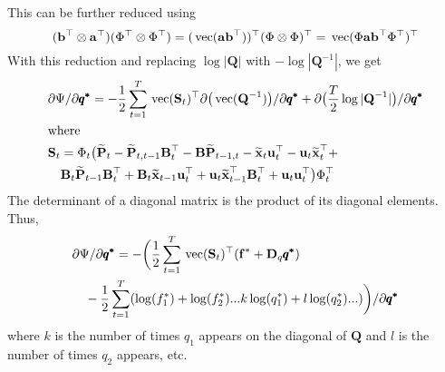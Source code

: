 \documentclass[]{article}
\def\UPS{\mbox{\boldmath $\Upsilon$}}
\def\BB{\mbox{$\mathbf B$}}	\def\bb{\mbox{$\mathbf b$}} \def\Bb{\mbox{$\mathbf J$}} \def\Ba{\mbox{$\mathbf L$}} \def\Bm{\UPS}
\def\DD{\mbox{$\mathbf D$}}	\def\dd{\mbox{$\mathbf d$}}
\def\PP{\mbox{$\mathbf P$}}  \def\pp{\mbox{$\mathbf p$}}
\def\QQ{\mbox{$\mathbf Q$}}	 \def\qq{\mbox{$\mathbf q$}} \def\Qb{\mbox{$\mathbf G$}}  \def\Qm{\mathbb{Q}}
\def\SS{\mbox{$\mathbf S$}}
\def\vec{\,\textup{\textrm{vec}}}
\def\hatxt{\widetilde{\mbox{$\mathbf x$}}_t}
\def\hatxtm{\widetilde{\mbox{$\mathbf x$}}_{t-1}}
\def\hatPt{\widetilde{\PP}_t}
\def\hatPtm{\widetilde{\PP}_{t-1}}
\def\hatPttm{\widetilde{\PP}_{t,t-1}}
\def\hatPtmt{\widetilde{\PP}_{t-1,t}}
\begin{document}
This can be further reduced using
$$(\bb^\top \otimes \aa^\top)(\Phi^\top \otimes \Phi^\top)=(\vec(\aa\bb^\top))^\top (\Phi \otimes \Phi)^\top = \vec(\Phi \aa\bb^\top \Phi^\top)^\top$$
With this reduction and replacing $\log|\QQ|$ with $-\log|\QQ^{-1}|$, we get
\begin{equation}
\begin{split}
&\partial\Psi/\partial\pmb{q^{*}} = -\frac{1}{2} \sum_{t=1}^T\vec(\SS_t)^\top\partial\big(\vec(\QQ^{-1})\big)/\partial\pmb{q^{*}}
+ \partial\big(\frac{T}{2}\log|\QQ^{-1}| \big)/\partial\pmb{q^{*}} \\
&\text{where }\\
&\SS_t=\Phi_t\big(\hatPt - \hatPttm \BB_t^\top - \BB\hatPtmt 
- \hatxt\uu_t^\top - \uu_t \hatxt^\top + \\
&\quad \BB_t\hatPtm\BB_t^\top + \BB_t\hatxtm\uu_t^\top + \uu_t\hatxtm^\top\BB_t^\top + \uu_t\uu_t^\top \big)\Phi_t^\top
\end{split}
\end{equation}
The determinant of a diagonal matrix is the product of its diagonal elements. Thus,
\begin{equation}\label{eq:Q.gendiag3}
\begin{split}
&\partial\Psi/\partial\pmb{q^{*}}= 
 -\bigg(\frac{1}{2} \sum_{t=1}^T \vec(\SS_t)^\top (\ff^{*} + \DD_q\pmb{q^{*}})  \\
&\quad - \frac{1}{2}\sum_{t=1}^T(\log(f^{*}_1) + \log(f^{*}_2) ... k\log(q^{*}_1) + l\log(q^{*}_2)...)\bigg)/\partial\pmb{q^{*}}\\
\end{split}
\end{equation}
where $k$ is the number of times $q_1$ appears on the diagonal of $\QQ$ and $l$ is the number of times $q_2$ appears, etc.
\end{document}
